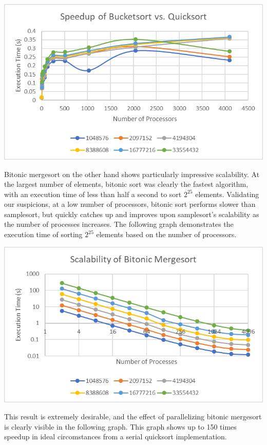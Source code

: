 \documentclass[10pt,letterpaper]{article}
\begin{document}
\begin{multicols}{2}
\begin{center}
\includegraphics[scale=1.3]{bucket_speedup}
\end{center}

Bitonic mergesort on the other hand shows particularly impressive scalability. At the largest number of elements, bitonic sort was clearly the fastest algorithm, with an execution time of less than half a second to sort $2^{25}$ elements. Validating our suspicions, at a low number of processors, bitonic sort performs slower than samplesort, but quickly catches up and improves upon samplesort's scalability as the number of processes increases. The following graph demonstrates the execution time of sorting $2^{25}$ elements based on the number of processors.

\begin{center}
\includegraphics[scale=1.3]{bitonic_scale}
\end{center}

This result is extremely desirable, and the effect of parallelizing bitonic mergesort is clearly visible in the following graph. This graph shows up to 150 times speedup in ideal circomstances from a serial quicksort implementation.


\end{multicols}
\end{document}
